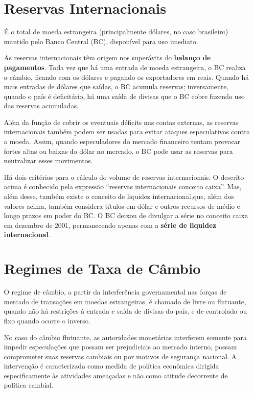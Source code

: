 \documentclass{article}\usepackage[]{graphicx}\usepackage[]{xcolor}
\begin{document}
\section*{Reservas Internacionais}

É o total de moeda estrangeira (principalmente dólares, no caso brasileiro) mantido pelo Banco 
Central (BC), disponível para uso imediato.\par

As reservas internacionais têm origem nos superávits do \textbf{balanço de pagamentos}. Toda vez que há 
uma entrada de moeda estrangeira, o BC realiza o câmbio, ficando com os dólares e pagando os 
exportadores em reais.  Quando há mais entradas de dólares que saídas, o BC acumula reservas; 
inversamente, quando o país é deficitário, há uma saída de divisas que o BC cobre fazendo uso 
das reservas acumuladas.\par

Além da função de cobrir os eventuais déficits nas contas externas, as reservas internacionais 
também podem ser usadas para evitar ataques especulativos contra a moeda. Assim, quando 
especuladores do mercado financeiro tentam provocar fortes altas ou baixas do dólar no mercado, 
o BC pode usar as reservas para neutralizar esses movimentos.\par

Há dois critérios para o cálculo do volume de reservas internacionais. O descrito acima é conhecido 
pela expressão \enquote{reservas internacionais conceito caixa}. Mas, além desse, também existe o conceito 
de liquidez internacional,que, além dos valores acima, também considera títulos em dólar e outros 
recursos de médio e longo prazos em poder do BC. O BC deixou de divulgar a série no conceito caixa 
em dezembro de 2001, permanecendo apenas com a \textbf{série de liquidez internacional}.\par

\section*{Regimes de Taxa de Câmbio}

O regime de câmbio, a partir da interferência governamental nas forças de mercado de transações em 
moedas estrangeiras, é chamado de livre ou flutuante, quando não há restrições à entrada e saída de 
divisas do país, e de controlado ou fixo quando ocorre o inverso.\par

No caso do câmbio flutuante, as autoridades monetárias interferem somente para impedir especulações 
que possam ser prejudiciais ao mercado interno, possam comprometer suas reservas cambiais ou por 
motivos de segurança nacional. A intervenção é caracterizada como medida de política econômica 
dirigida especificamente às atividades ameaçadas e não como atitude decorrente de política cambial.\par
\end{document}
